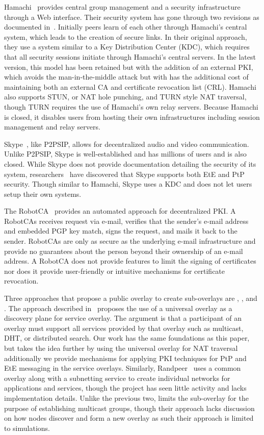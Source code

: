 \documentclass[conference]{IEEEtran}
\begin{document}
Hamachi~\cite{hamachi} provides central group management and a security
infrastructure through a Web interface.  Their security system has gone through
two revisions as documented in~\cite{hamachi_security}.  Initially peers learn
of each other through Hamachi's central system, which leads to the creation of
secure links.  In their original approach, they use a system similar to a Key
Distribution Center (KDC), which requires that all security sessions initiate
through Hamachi's central servers.  In the latest version, this model has been
retained but with the addition of an external PKI, which avoids the
man-in-the-middle attack but with has the additional cost of maintaining both
an external CA and certificate revocation list (CRL).  Hamachi also supports
STUN, or NAT hole punching, and TURN style NAT traversal, though TURN requires the use of
Hamachi's own relay servers.  Because Hamachi is closed, it disables users from
hosting their own infrastructures including session management and relay
servers.

Skype~\cite{skype}, like P2PSIP, allows for decentralized audio and video
communication. Unlike P2PSIP, Skype is well-established and has millions
of users and is also closed.  While Skype does not provide documentation
detailing the security of its system, researchers~\cite{skype_auth,
skype_overview} have discovered that Skype supports both EtE and PtP security.
Though similar to Hamachi, Skype uses a KDC and does not let users setup their
own systems.

The RobotCA~\cite{robotca} provides an automated approach for decentralized
PKI.  A RobotCAs receives request via e-mail, verifies that the sender's e-mail
address and embedded PGP key match, signs the request, and mails it back to the
sender.  RobotCAs are only as secure as the underlying e-mail infrastructure
and provide no guarantees about the person beyond their ownership of an e-mail
address.  A RobotCA does not provide features to limit the signing of
certificates nor does it provide user-friendly or intuitive mechanisms for
certificate revocation.

Three approaches that propose a public overlay to create sub-overlays are
\cite{one_ring}, \cite{randpeer}, and \cite{can_multicast}.
The approach described in~\cite{one_ring} proposes the use of a universal
overlay as a discovery plane for
service overlay.  The argument is that a participant of an overlay
must support all services provided by that overlay such as multicast, DHT,
or distributed search.  Our work has the same foundations as this paper, but
takes the idea further by using the universal overlay for NAT traversal
additionally we provide mechanisms for applying PKI techniques for PtP and EtE
messaging in the service overlays.
Similarly, Randpeer~\cite{randpeer} uses a common overlay along with a
subnetting service to create individual networks for applications and services,
though the project has seen little activity and lacks implementation details.
Unlike the previous two, \cite{can_multicast} limits the sub-overlay for the
purpose of establishing multicast groups, though their approach lacks discussion
on how nodes discover and form a new overlay as such their approach is limited
to simulations.
\end{document}
